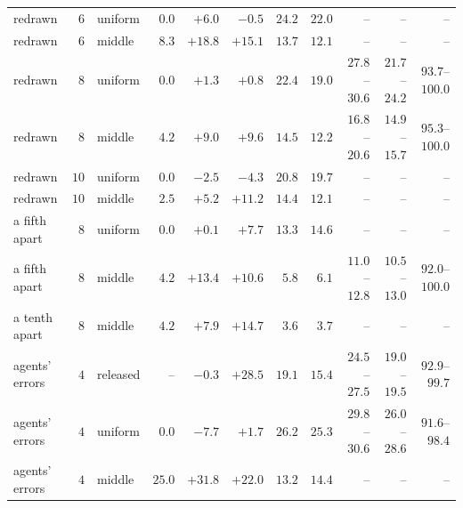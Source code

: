 \documentclass{article}
\begin{document}
\begin{table}[htbp]
{\begin{tabular}{lrlrrrrrrrr}
redrawn & $6$ & uniform & $0.0$ & $+6.0$ & $-0.5$ & $24.2$ & $22.0$ & -- & -- & --\\
redrawn & $6$ & middle & $8.3$ & $+18.8$ & $+15.1$ & $13.7$ & $12.1$ & -- & -- & --\\
redrawn & $8$ & uniform & $0.0$ & $+1.3$ & $+0.8$ & $22.4$ & $19.0$ & $27.8$--$30.6$ & $21.7$--$24.2$ & $93.7$--$100.0$\\
redrawn & $8$ & middle & $4.2$ & $+9.0$ & $+9.6$ & $14.5$ & $12.2$ & $16.8$--$20.6$ & $14.9$--$15.7$ & $95.3$--$100.0$\\
redrawn & $10$ & uniform & $0.0$ & $-2.5$ & $-4.3$ & $20.8$ & $19.7$ & -- & -- & --\\
redrawn & $10$ & middle & $2.5$ & $+5.2$ & $+11.2$ & $14.4$ & $12.1$ & -- & -- & --\\
a fifth apart & $8$ & uniform & $0.0$ & $+0.1$ & $+7.7$ & $13.3$ & $14.6$ & -- & -- & --\\
a fifth apart & $8$ & middle & $4.2$ & $+13.4$ & $+10.6$ & $5.8$ & $6.1$ & $11.0$--$12.8$ & $10.5$--$13.0$ & $92.0$--$100.0$\\
a tenth apart & $8$ & middle & $4.2$ & $+7.9$ & $+14.7$ & $3.6$ & $3.7$ & -- & -- & --\\
agents' errors & $4$ & released & -- & $-0.3$ & $+28.5$ & $19.1$ & $15.4$ & $24.5$--$27.5$ & $19.0$--$19.5$ & $92.9$--$99.7$\\
agents' errors & $4$ & uniform & $0.0$ & $-7.7$ & $+1.7$ & $26.2$ & $25.3$ & $29.8$--$30.6$ & $26.0$--$28.6$ & $91.6$--$98.4$\\
agents' errors & $4$ & middle & $25.0$ & $+31.8$ & $+22.0$ & $13.2$ & $14.4$ & -- & -- & --\\
\bottomrule
\end{tabular}}
\end{table}
\end{document}
